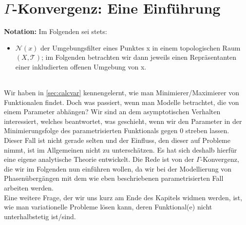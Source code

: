 \chapter[Gamma-Konvergenz: Eine Einführung]{\(\Gamma\)-Konvergenz: Eine Einführung}{\label{ch:gamma}}
\colorbox{generalYellow}{\begin{minipage}{16cm}{\textcolor{black}{}{\label{not3}}}
\textbf{Notation:} Im Folgenden sei stets:
\begin{itemize}
    \item \(\mathcal{N}(x)\) der Umgebungsfilter eines Punktes x in einem topologischen Raum \((X,\mathcal{T})\); im Folgenden betrachten wir dann jeweils einen Repräsentanten einer inkludierten offenen Umgebung von x.
\end{itemize}
\end{minipage}}\\

Wir haben in \ref{sec:calcvar} kennengelernt, wie man Minimierer/Maximierer von Funktionalen findet. Doch was passiert, wenn man Modelle betrachtet, die von einem Parameter abhängen? Wir sind an dem asymptotischen Verhalten interessiert, welches beantwortet, was geschieht, wenn wir den Parameter in der Minimierungsfolge des parametrisierten Funktionals gegen 0 streben lassen.\\
Dieser Fall ist nicht gerade selten und der Einfluss, den dieser auf Probleme nimmt, ist im Allgemeinen nicht zu unterschätzen. Es hat sich deshalb hierfür eine eigene analytische Theorie entwickelt. Die Rede ist von der \(\Gamma\)-Konvergenz, die wir im Folgenden nun einführen wollen, da wir bei der Modellierung von Phasenübergängen mit dem wie eben beschriebenen parametrisierten Fall arbeiten werden.\\
Eine weitere Frage, der wir uns kurz am Ende des Kapitels widmen werden, ist, wie man variationelle Probleme lösen kann, deren Funktional(e) nicht unterhalbstetig ist/sind.\\


